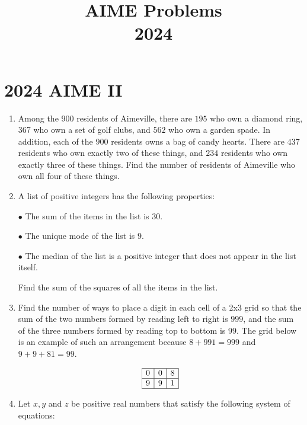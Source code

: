 \documentclass{article}
\title{AIME Problems \\ 2024}
\date{}
\begin{document}
\maketitle\thispagestyle{fancy}\newpage\section*{2024 AIME II}
\begin{enumerate}[label=\arabic*., itemsep=0.5em]
\item Among the \(900\) residents of Aimeville, there are \(195\) who own a diamond ring, \(367\) who own a set of golf clubs, and \(562\) who own a garden spade. In addition, each of the \(900\) residents owns a bag of candy hearts. There are \(437\) residents who own exactly two of these things, and \(234\) residents who own exactly three of these things. Find the number of residents of Aimeville who own all four of these things.\par \vspace{0.5em}\item A list of positive integers has the following properties:

\(\bullet\) The sum of the items in the list is \(30\).

\(\bullet\) The unique mode of the list is \(9\).

\(\bullet\) The median of the list is a positive integer that does not appear in the list itself.

Find the sum of the squares of all the items in the list.\par \vspace{0.5em}\item Find the number of ways to place a digit in each cell of a 2x3 grid so that the sum of the two numbers formed by reading left to right is \(999\), and the sum of the three numbers formed by reading top to bottom is \(99\). The grid below is an example of such an arrangement because \(8+991=999\) and \(9+9+81=99\).


\begin{equation*}
\begin{array}{|c|c|c|} \hline
0 & 0 & 8 \\ \hline
9 & 9 & 1 \\ \hline
\end{array}
\end{equation*}
\par \vspace{0.5em}\item Let \(x,y\) and \(z\) be positive real numbers that satisfy the following system of equations:


\end{enumerate}
\end{document}
